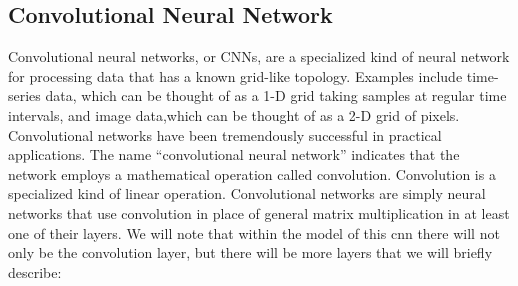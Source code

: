 \documentclass{article}
\begin{document}
\newpage
\subsection{Convolutional Neural Network }
Convolutional neural networks, or CNNs, are a specialized kind of neural network for processing data that has a known grid-like topology. Examples include time-series data, which can be thought of as a 1-D grid taking samples at regular time intervals, and image data,which can be thought of as a 2-D grid of pixels. Convolutional networks have been tremendously successful in practical applications. The name “convolutional neural network” indicates that the network employs a mathematical operation called convolution. Convolution is a specialized kind of linear operation. Convolutional networks are simply neural networks that use convolution in place of general matrix multiplication in at least one of their layers.\cite{goodfellow2016deep} We will note that within the model of this \acrshort{cnn} there will not only be the convolution layer, but there will be more layers that we will briefly describe:
\end{document}

